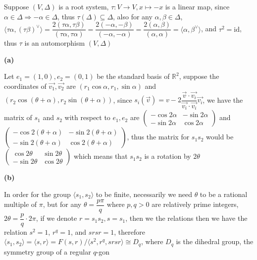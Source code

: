 \documentclass[main]{subfiles}
\begin{document}
\begin{exercise}
\begin{enumerate}[label=(\alph*),leftmargin=*]

\end{enumerate}
\end{exercise}

Suppose $(V,\Delta)$ is a root system, $\tau:V\to V,x\mapsto-x$ is a linear map, since $\alpha\in\Delta\Rightarrow-\alpha\in\Delta$, thus $\tau(\Delta)\subseteq\Delta$, also for any $\alpha,\beta\in\Delta$, $\langle\tau\alpha,(\tau\beta)^\vee\rangle=\dfrac{2(\tau\alpha,\tau\beta)}{(\tau\alpha,\tau\alpha)}=\dfrac{2(-\alpha,-\beta)}{(-\alpha,-\alpha)}=\dfrac{2(\alpha,\beta)}{(\alpha,\alpha)}=\langle\alpha,\beta^\vee\rangle$, and $\tau^2=\mathrm{id}$, thus $\tau$ is an automorphism $(V,\Delta)$ \\

\begin{exercise}
\begin{enumerate}[label=(\alph*),leftmargin=*]

\end{enumerate}
\end{exercise}

\textbf{(a)} \par
Let $e_1=(1,0),e_2=(0,1)$ be the standard basis of $\mathbb R^2$, suppose the coordinates of $\vec{v_1},\vec{v_2}$ are $(r_1\cos\alpha,r_1,\sin\alpha)$ and $(r_2\cos(\theta+\alpha),r_2\sin(\theta+\alpha))$, since $s_i(\vec{v})=v-2\dfrac{\vec{v}\cdot\vec{v_i}}{\vec{v_i}\cdot \vec{v_i}}\vec{v_i}$, we have the matrix of $s_1$ and $s_2$ with respect to $e_1,e_2$ are $\begin{pmatrix}
-\cos2\alpha&-\sin2\alpha \\
-\sin2\alpha&\cos2\alpha
\end{pmatrix}$ and $\begin{pmatrix}
-\cos2(\theta+\alpha)&-\sin2(\theta+\alpha) \\
-\sin2(\theta+\alpha)&\cos2(\theta+\alpha)
\end{pmatrix}$, thus the matrix for $s_1s_2$ would be $\begin{pmatrix}
\cos2\theta&\sin2\theta \\
-\sin2\theta&\cos2\theta
\end{pmatrix}$ which means that $s_1s_2$ is a rotation by $2\theta$ \par
\textbf{(b)} \par
In order for the group $\langle s_1,s_2\rangle$ to be finite, necessarily we need $\theta$ to be a rational multiple of $\pi$, but for any $\theta=\dfrac{p\pi}{q}$ where $p,q>0$ are relatively prime integers, $2\theta=\dfrac{p}{q}\cdot 2\pi$, if we denote $r=s_1s_2,s=s_1$, then we the relations then we have the relation $s^2=1$, $r^q=1$, and $srsr=1$, therefore $\langle s_1,s_2\rangle=\langle s,r\rangle=F(s,r)/\langle s^2,r^q,srsr\rangle\cong D_{q}$, where $D_q$ is the dihedral group, the symmetry group of a regular $q$-gon \par
\end{document}
